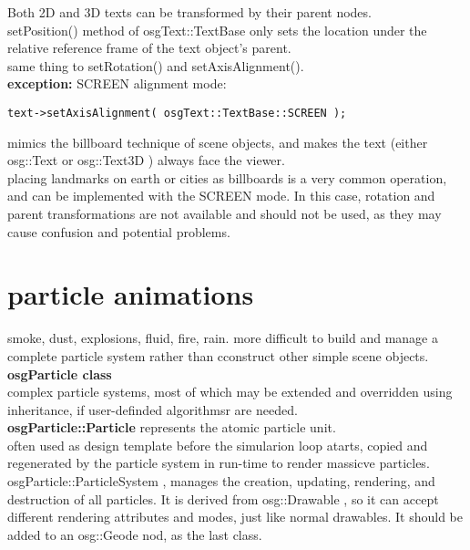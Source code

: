 \documentclass[a4paper,12pt]{book}
\begin{document}
Both 2D and 3D texts can be transformed by their parent nodes.\\
setPosition() method of osgText::TextBase only sets
the location under the relative reference frame of the text object's parent.\\
same thing to setRotation() and setAxisAlignment().\\
\textbf{exception:} SCREEN alignment mode:
\begin{lstlisting}
text->setAxisAlignment( osgText::TextBase::SCREEN );
\end{lstlisting}mimics the billboard technique of scene objects, and makes the text (either osg::Text
or osg::Text3D ) always face the viewer.\\
placing landmarks on earth or cities as billboards is a very common operation, and can be
implemented with the SCREEN mode. In this case, rotation and parent transformations are
not available and should not be used, as they may cause confusion and potential problems.\\

\section{particle animations}
smoke, dust, explosions, fluid, fire, rain.
more difficult to build and manage a complete particle system rather than cconstruct other simple scene objects.\\
\textrightarrow \textbf{osgParticle class}\\
\textrightarrow complex particle systems, most of which may be extended and overridden using inheritance, if user-definded algorithmsr are needed.\\

\textbf{osgParticle::Particle} represents the atomic particle unit.\\
\textrightarrow often used as design template before the simularion loop atarts, copied and regenerated by the particle system in run-time to render massicve particles.\\

osgParticle::ParticleSystem , manages the creation,
updating, rendering, and destruction of all particles. It is derived from osg::Drawable ,
so it can accept different rendering attributes and modes, just like normal drawables. It
should be added to an osg::Geode nod, as the last class.\\
\end{document}
